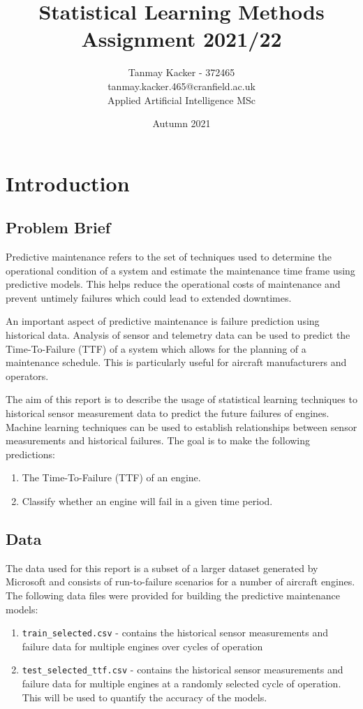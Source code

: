 \documentclass{article}
\title{Statistical Learning Methods Assignment 2021/22}
\author{Tanmay Kacker - 372465 \\ tanmay.kacker.465@cranfield.ac.uk \\ Applied Artificial Intelligence MSc}
\date{Autumn 2021}
\begin{document}
\maketitle
\newpage
\section{Introduction}
\subsection{Problem Brief}
Predictive maintenance refers to the set of techniques used to determine the operational condition of a system and estimate the maintenance time frame using predictive models.
This helps reduce the operational costs of maintenance and prevent untimely failures which could lead to extended downtimes.

An important aspect of predictive maintenance is failure prediction using historical data.
Analysis of sensor and telemetry data can be used to predict the Time-To-Failure (TTF) of a system which allows for the planning of a maintenance schedule. This is particularly useful for aircraft manufacturers and operators.

The aim of this report is to describe the usage of statistical learning techniques to historical sensor measurement data to predict the future failures of engines. Machine learning techniques can be used to establish relationships between sensor measurements and historical failures.
The goal is to make the following predictions:
\begin{enumerate}[topsep=0pt]
	\item The Time-To-Failure (TTF) of an engine.
	\item Classify whether an engine will fail in a given time period.
\end{enumerate}

\subsection{Data}
The data used for this report is a subset of a larger dataset generated by Microsoft and consists of run-to-failure scenarios for a number of aircraft engines.
The following data files were provided for building the predictive maintenance models:
\begin{enumerate}[topsep=0pt]
	\item \texttt{train\_selected.csv} - contains the historical sensor measurements and failure data for multiple engines over cycles of operation
	\item \texttt{test\_selected\_ttf.csv} - contains the historical sensor measurements and failure data for multiple engines at a randomly selected cycle of operation. This will be used to quantify the accuracy of the models.
\end{enumerate}
\end{document}
